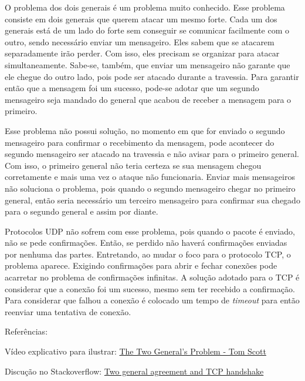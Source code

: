 O problema dos dois generais é um problema muito conhecido. Esse problema consiste em dois generais
que querem atacar um mesmo forte. Cada um dos generais está de um lado do forte sem conseguir se comunicar
facilmente com o outro, sendo necessário enviar um mensageiro. Eles sabem que se atacarem separadamente irão perder. Com isso, eles precisam
se organizar para atacar simultaneamente. Sabe-se, também, que enviar um mensageiro não garante que ele chegue do outro lado, pois pode ser
atacado durante a travessia. Para garantir então que a mensagem foi um sucesso, pode-se adotar que um segundo mensageiro seja mandado do general
que acabou de receber a mensagem para o primeiro.

Esse problema não possui solução, no momento em que for enviado o segundo mensageiro para confirmar o recebimento da mensagem,
pode acontecer do segundo mensageiro ser atacado na travessia e não avisar para o primeiro general. Com isso, o primeiro general não teria certeza
se sua mensagem chegou corretamente e mais uma vez o ataque não funcionaria. Enviar mais mensageiros não soluciona o problema, pois quando o segundo
mensageiro chegar no primeiro general, então seria necessário um terceiro mensageiro para confirmar sua chegado
para o segundo general e assim por diante.

Protocolos UDP não sofrem com esse problema, pois quando o pacote é enviado, não se pede confirmações. Então, se perdido não haverá
confirmações enviadas por nenhuma das partes. Entretando, ao mudar o foco para o protocolo TCP, o problema aparece. Exigindo confirmações
para abrir e fechar conexões pode acarretar no problema de confirmações infinitas. A solução adotado para o TCP é considerar que a conexão
foi um sucesso, mesmo sem ter recebido a confirmação. Para considerar que falhou a conexão é colocado um tempo de \emph{timeout} para então
reenviar uma tentativa de conexão.


\vspace{1cm}
\noindent Referências:

\noindent Vídeo explicativo para ilustrar: \href{https://www.youtube.com/watch?v=IP-rGJKSZ3s}{The Two General's Problem - Tom Scott}

\noindent Discução no Stackoverflow: \href{https://stackoverflow.com/questions/36352236/two-general-agreement-and-tcp-handshake}{Two general agreement and TCP handshake}